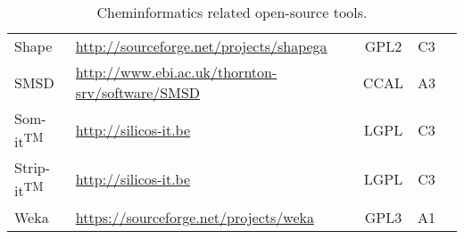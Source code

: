 \begin{table}
\begin{tabular}{ l l c c c  }
Shape & \url{http://sourceforge.net/projects/shapega} & GPL2  & C3 & \cite{Rosen_2009}\\
SMSD & \url{http://www.ebi.ac.uk/thornton-srv/software/SMSD} & CCAL & A3 & \cite{Rahman_2009} \\
Som-it\textsuperscript{TM}  & \url{http://silicos-it.be} & LGPL & C3 & \\
Strip-it\textsuperscript{TM}  & \url{http://silicos-it.be} & LGPL & C3 & \\
Weka & \url{https://sourceforge.net/projects/weka} & GPL3 & A1 & \cite{Hall_2009} \\
    \end{tabular} 
    \caption{\label{qsartable} Cheminformatics related open-source tools.}
\end{table}
